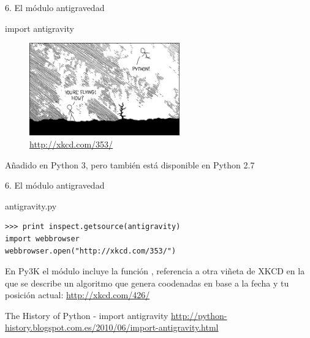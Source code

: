 \documentclass[14pt]{beamer}
\begin{document}
\begin{frame}{6. El módulo antigravedad}
  \Large
  \begin{block}{}
    \centering import antigravity
  \end{block}{}

  \begin{figure}
    \centering
    \includegraphics[height=4cm]{pics/xkcd-353.png}
    \caption{\url{http://xkcd.com/353/}}
  \end{figure}

  \small
  \begin{alertblock}{}
    \centering
    Añadido en Python 3, pero también está disponible en Python 2.7
  \end{alertblock}
\end{frame}

\begin{frame}[fragile]{6. El módulo antigravedad}
  \begin{exampleblock}{\small antigravity.py}
    \small
    \begin{lstlisting}
>>> print inspect.getsource(antigravity)
import webbrowser
webbrowser.open("http://xkcd.com/353/")
    \end{lstlisting}
  \end{exampleblock}

  \begin{center}
     \small
     En Py3K el módulo  incluye la función
     , referencia a otra viñeta de XKCD en la que
     se describe un algoritmo que genera coodenadas en base a la fecha
     y tu posición actual: \url{http://xkcd.com/426/}
  \end{center}

  \small
  \begin{block}{\centering The History of Python - import antigravity}
    \centering
    \scriptsize
    \url{http://python-history.blogspot.com.es/2010/06/import-antigravity.html}
  \end{block}
\end{frame}
\end{document}
